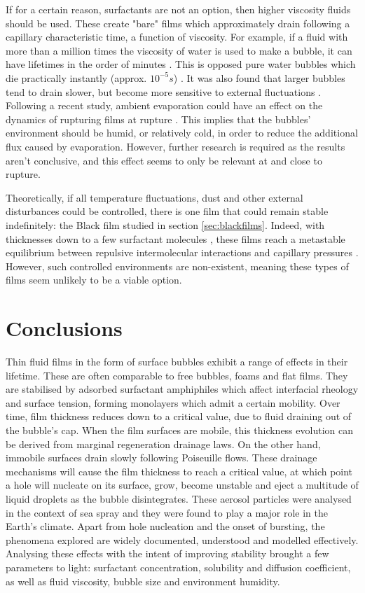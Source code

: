 \documentclass[a4paper,12pt]{article}
\numberwithin{equation}{section}
\numberwithin{figure}{section}
\numberwithin{table}{section}
\begin{document}
If for a certain reason, surfactants are not an option, then higher viscosity fluids should be used. These create "bare" films which approximately drain following a capillary characteristic time, a function of viscosity. For example, if a fluid with more than a million times the viscosity of water is used to make a bubble, it can have lifetimes in the order of minutes \cite{Debregeas1998}. This is opposed pure water bubbles which die practically instantly (approx. $10^{-5} s$) \cite{Lhuissier2011}. It was also found that larger bubbles tend to drain slower, but become more sensitive to external fluctuations \cite{Debregeas1998}. Following a recent study, ambient evaporation could have an effect on the dynamics of rupturing films at rupture \cite{ChampougnyEvap2018}. This implies that the bubbles' environment should be humid, or relatively cold, in order to reduce the additional flux caused by evaporation. However, further research is required as the results aren't conclusive, and this effect seems to only be relevant at and close to rupture.

Theoretically, if all temperature fluctuations, dust and other external disturbances could be controlled, there is one film that could remain stable indefinitely: the Black film studied in section \ref{sec:blackfilms}. Indeed, with thicknesses down to a few surfactant molecules \cite{Casteletto2003}, these films reach a metastable equilibrium between repulsive intermolecular interactions and capillary pressures \cite{Breward2002, ChampougnyEvap2018, Cantat2010, Vrij1968, VrijDiscussion1966}. However, such controlled environments are non-existent, meaning these types of films seem unlikely to be a viable option.

\newpage
\section{Conclusions}
Thin fluid films in the form of surface bubbles exhibit a range of effects in their lifetime. These are often comparable to free bubbles, foams and flat films. They are stabilised by adsorbed surfactant amphiphiles which affect interfacial rheology and surface tension, forming monolayers which admit a certain mobility. Over time, film thickness reduces down to a critical value, due to fluid draining out of the bubble's cap. When the film surfaces are mobile, this thickness evolution can be derived from marginal regeneration drainage laws. On the other hand, immobile surfaces drain slowly following Poiseuille flows. These drainage mechanisms will cause the film thickness to reach a critical value, at which point a hole will nucleate on its surface, grow, become unstable and eject a multitude of liquid droplets as the bubble disintegrates. These aerosol particles were analysed in the context of sea spray and they were found to play a major role in the Earth's climate. Apart from hole nucleation and the onset of bursting, the phenomena explored are widely documented, understood and modelled effectively. Analysing these effects with the intent of improving stability brought a few parameters to light: surfactant concentration, solubility and diffusion coefficient, as well as fluid viscosity, bubble size and environment humidity.
\end{document}
